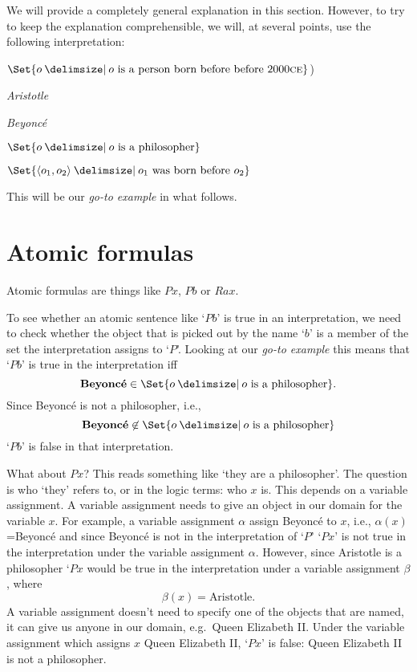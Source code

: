 We will provide a completely general explanation in this section. However, to try to keep the explanation comprehensible, we will, at several points, use the following interpretation:
	\begin{interp}
		\item[\domain]$\Set{o \given o\text{ is a person born before before 2000\textsc{ce}}}$)
		\item[\denote{a}] \emph{Aristotle}
		\item[\denote{b}] \emph{Beyonc\'e}
		\item[\denote{P}] $\Set{o \given o\text{ is a philosopher}}$
		\item[\denote{R}] $\Set{\langle o_1,o_2\rangle \given o_1\text{ was born before }o_2}$
	\end{interp}
This will be our \emph{go-to example} in what follows.
%
\section{Atomic formulas}\label{s:traf}
Atomic formulas are things like $Px$, $Pb$ or $Rax$.

To see whether an atomic sentence like `$Pb$' is true in an interpretation, we need to check whether the object that is picked out by the name `$b$' is a member of the set the interpretation assigns to `$P$'. Looking at our \emph{go-to example} this means that `$Pb$' is true in the interpretation iff $$\text{\emph{Beyonc\'e}}\in\Set{o \given o\text{ is a philosopher}}.$$
Since Beyonc\'e is not a philosopher, i.e., 
$$\text{\emph{Beyonc\'e}}\not\in\Set{o \given o\text{ is a philosopher}}$$
`$Pb$' is false in that interpretation.


What about $Px$? This reads something like `they are a philosopher'. The question is who `they' refers to, or in the logic terms: who $x$ is. This depends on a variable assignment. A variable assignment needs to give an object in our domain for the variable $x$. For example, a variable assignment $\alpha$  assign Beyonc\'e to $x$, i.e., $\alpha(x)$=Beyonc\'e and since Beyonc\'e is not in the interpretation of `$P$' `$Px$' is not true in the interpretation under the variable assignment $\alpha$. However, since Aristotle is a philosopher `$Px$ would be true in the interpretation under a variable assignment $\beta$, where $$\beta(x)=\text{Aristotle}.$$
A variable assignment doesn't need to specify one of the objects that are named, it can give us anyone in our domain, e.g.~Queen Elizabeth II. Under the variable assignment which assigns $x$ Queen Elizabeth II, `$Px$' is false: Queen Elizabeth II is not a philosopher.

